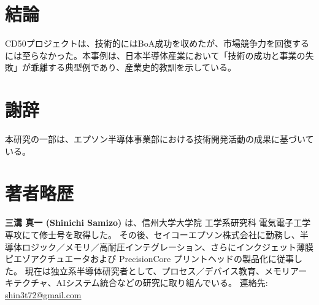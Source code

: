 \documentclass[conference]{IEEEtran}
\begin{document}
\section{結論}
CD50プロジェクトは、技術的にはBoA成功を収めたが、市場競争力を回復するには至らなかった。本事例は、日本半導体産業において「技術の成功と事業の失敗」が乖離する典型例であり、産業史的教訓を示している。

\section*{謝辞}
本研究の一部は、エプソン半導体事業部における技術開発活動の成果に基づいている。

\section*{著者略歴}
\textbf{三溝 真一 (Shinichi Samizo)} は、信州大学大学院 工学系研究科 電気電子工学専攻にて修士号を取得した。  
その後、セイコーエプソン株式会社に勤務し、半導体ロジック／メモリ／高耐圧インテグレーション、さらにインクジェット薄膜ピエゾアクチュエータおよび PrecisionCore プリントヘッドの製品化に従事した。  
現在は独立系半導体研究者として、プロセス／デバイス教育、メモリアーキテクチャ、AIシステム統合などの研究に取り組んでいる。  
連絡先: \href{mailto:shin3t72@gmail.com}{shin3t72@gmail.com}
\end{document}
